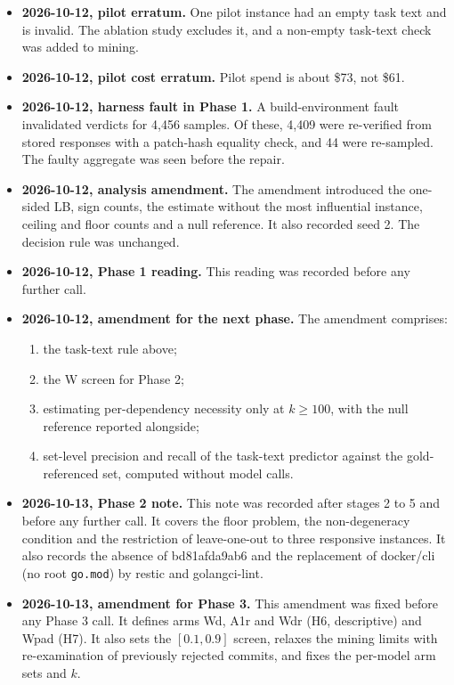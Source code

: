 \begin{itemize}
\item \textbf{2026-10-12, pilot erratum.} One pilot instance had an empty task text and is invalid. The ablation study excludes it, and a non-empty task-text check was added to mining.
\item \textbf{2026-10-12, pilot cost erratum.} Pilot spend is about \$73, not \$61.
\item \textbf{2026-10-12, harness fault in Phase 1.} A build-environment fault invalidated verdicts for 4,456 samples. Of these, 4,409 were re-verified from stored responses with a patch-hash equality check, and 44 were re-sampled. The faulty aggregate was seen before the repair.
\item \textbf{2026-10-12, analysis amendment.} The amendment introduced the one-sided LB, sign counts, the estimate without the most influential instance, ceiling and floor counts and a null reference. It also recorded seed 2. The decision rule was unchanged.
\item \textbf{2026-10-12, Phase 1 reading.} This reading was recorded before any further call.
\item \textbf{2026-10-12, amendment for the next phase.} The amendment comprises:
  \begin{enumerate}
  \item[(i)] the task-text rule above;
  \item[(ii)] the W screen for Phase 2;
  \item[(iii)] estimating per-dependency necessity only at $k \geq 100$, with the null reference reported alongside;
  \item[(iv)] set-level precision and recall of the task-text predictor against the gold-referenced set, computed without model calls.
  \end{enumerate}
\item \textbf{2026-10-13, Phase 2 note.} This note was recorded after stages 2 to 5 and before any further call. It covers the floor problem, the non-degeneracy condition and the restriction of leave-one-out to three responsive instances. It also records the absence of bd81afda9ab6 and the replacement of docker/cli (no root \texttt{go.mod}) by restic and golangci-lint.
\item \textbf{2026-10-13, amendment for Phase 3.} This amendment was fixed before any Phase 3 call. It defines arms Wd, A1r and Wdr (H6, descriptive) and Wpad (H7). It also sets the $[0.1, 0.9]$ screen, relaxes the mining limits with re-examination of previously rejected commits, and fixes the per-model arm sets and $k$.
\end{itemize}

